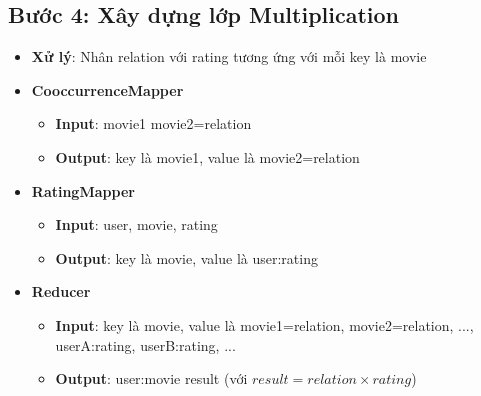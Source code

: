 \subsection*{Bước 4: Xây dựng lớp Multiplication}
\begin{itemize}
    \item \textbf{Xử lý}: Nhân relation với rating tương ứng với mỗi key là movie
    \item \textbf{CooccurrenceMapper}
          \begin{itemize}
              \item \textbf{Input}: movie1 \quad movie2=relation \\
              \item \textbf{Output}: key là movie1, value là movie2=relation \\
          \end{itemize}
    \item \textbf{RatingMapper}
          \begin{itemize}
              \item \textbf{Input}: user, movie, rating \\
              \item \textbf{Output}: key là movie, value là user:rating \\
          \end{itemize}
    \item \textbf{Reducer}
          \begin{itemize}
              \item \textbf{Input}: key là movie, value là movie1=relation, movie2=relation, ..., userA:rating, userB:rating, ... \\
              \item \textbf{Output}: user:movie \quad result (với $result = relation \times rating$) \\
          \end{itemize}
\end{itemize}
